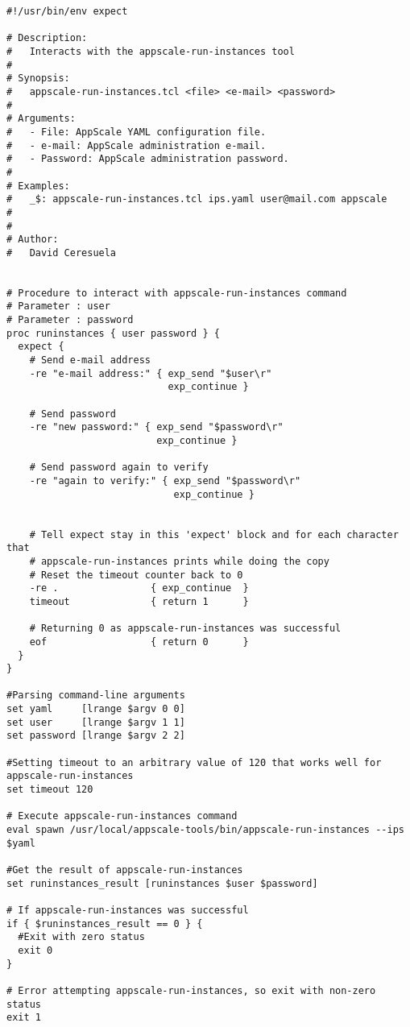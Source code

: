 \begin{lstlisting}
#!/usr/bin/env expect

# Description:
#   Interacts with the appscale-run-instances tool
#
# Synopsis:
#   appscale-run-instances.tcl <file> <e-mail> <password>
#
# Arguments:
#   - File: AppScale YAML configuration file.
#   - e-mail: AppScale administration e-mail.
#   - Password: AppScale administration password.
#
# Examples:
#   _$: appscale-run-instances.tcl ips.yaml user@mail.com appscale
#
#
# Author:
#   David Ceresuela


# Procedure to interact with appscale-run-instances command
# Parameter : user
# Parameter : password 
proc runinstances { user password } {
  expect {
    # Send e-mail address
    -re "e-mail address:" { exp_send "$user\r"
                            exp_continue }

    # Send password
    -re "new password:" { exp_send "$password\r"
                          exp_continue }
    
    # Send password again to verify
    -re "again to verify:" { exp_send "$password\r"
                             exp_continue }
    
            
    # Tell expect stay in this 'expect' block and for each character that
    # appscale-run-instances prints while doing the copy
    # Reset the timeout counter back to 0
    -re .                { exp_continue  }
    timeout              { return 1      }
    
    # Returning 0 as appscale-run-instances was successful
    eof                  { return 0      }
  }
}

#Parsing command-line arguments
set yaml     [lrange $argv 0 0]
set user     [lrange $argv 1 1]
set password [lrange $argv 2 2]

#Setting timeout to an arbitrary value of 120 that works well for appscale-run-instances
set timeout 120

# Execute appscale-run-instances command
eval spawn /usr/local/appscale-tools/bin/appscale-run-instances --ips $yaml

#Get the result of appscale-run-instances
set runinstances_result [runinstances $user $password]

# If appscale-run-instances was successful
if { $runinstances_result == 0 } {
  #Exit with zero status
  exit 0
}

# Error attempting appscale-run-instances, so exit with non-zero status
exit 1
\end{lstlisting}


